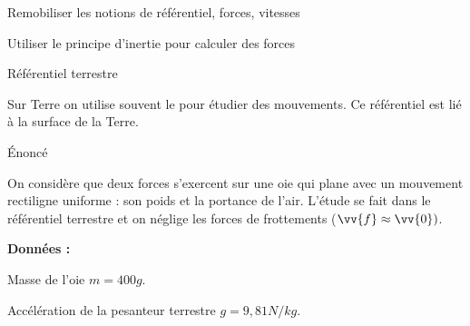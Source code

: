 \sndEnTeteDeux




\begin{objectifs}
  \item Remobiliser les notions de référentiel, forces, vitesses
  \item Utiliser le principe d'inertie pour calculer des forces
\end{objectifs}


\begin{doc}{Référentiel terrestre}
  \vspace*{-24pt}
  \begin{encart}
     Sur Terre on utilise souvent le  pour étudier des mouvements. Ce référentiel est lié à la surface de la Terre.
  \end{encart}
\end{doc}


\vspace*{-12pt}

\vspace{-12pt}
\begin{doc}{Énoncé}
  \vspace*{-20pt}
  \begin{center}
  \end{center}
  
  
  On considère que deux forces s'exercent sur une oie qui plane avec un mouvement rectiligne uniforme : son poids et la portance de l'air.
  L'étude se fait dans le référentiel terrestre et on néglige les forces de frottements ($\vv{f} \approx \vv{0})$.

  \textbf{Données :}
  \begin{listePoints}
    \item Masse de l'oie $m = 400 \unit{g}$.
    \item Accélération de la pesanteur terrestre $g = 9,\!81 \unit{N/kg}$.
  \end{listePoints}
\end{doc}



